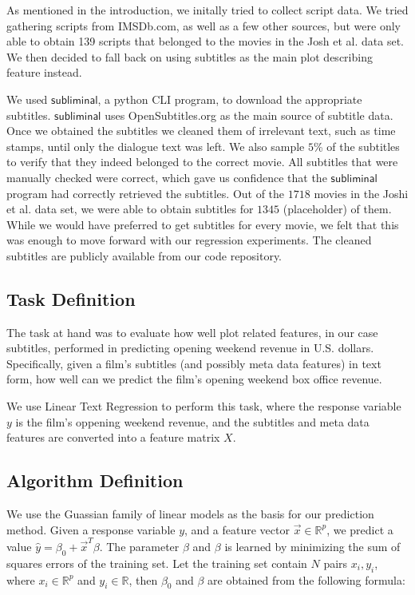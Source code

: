 \documentclass[11pt]{article}
\begin{document}
As mentioned in the introduction, we initally tried to collect script data. We tried
gathering scripts from IMSDb.com, as well as a few other sources, but were only able
to obtain 139 scripts that belonged to the movies in the Josh et al. data set. We then
decided to fall back on using subtitles as the main plot describing feature instead.

We used $\mathsf{subliminal}$, a python CLI program, to download the appropriate
subtitles. $\mathsf{subliminal}$ uses OpenSubtitles.org as the main source of subtitle
data. Once we obtained the subtitles we cleaned them of irrelevant text, such as time
stamps, until only the dialogue text was left. We also sample $5$\% of the subtitles to
verify that they indeed belonged to the correct movie. All subtitles that were manually
checked were correct, which gave us confidence that the $\mathsf{subliminal}$ program
had correctly retrieved the subtitles. Out of the $1718$ movies in the Joshi
et al. data set, we were able to obtain subtitles for $1345$ (placeholder) of them.
While we would have preferred to get subtitles for every movie, we felt that this was
enough to move forward with our regression experiments. The cleaned subtitles are
publicly available from our code repository.

\subsection{Task Definition}
The task at hand was to evaluate how well plot related features, in our case subtitles,
performed in predicting opening weekend revenue in U.S. dollars. Specifically, given
a film's subtitles (and possibly meta data features) in text form, how well can we
predict the film's opening weekend box office revenue.

We use Linear Text Regression to perform this task, where the response variable $y$ is
the film's oppening weekend revenue, and the subtitles and meta data features are
converted into a feature matrix $X$.

\subsection{Algorithm Definition}
We use the Guassian family of linear models as the basis for our prediction method.
Given a response variable $y$, and a feature vector $\vec{x} \in \mathbb{R}^p$, we
predict a value $\hat{y} = \beta_0 + \vec{x}^T \beta$. The parameter $\beta$ and $\beta$
is learned by minimizing the sum of squares errors of the training set. Let the training
set contain $N$ pairs $x_i,y_i$, where $x_i \in \mathbb{R}^p$ and $y_i \in \mathbb{R}$,
then $\beta_0$ and $\beta$ are obtained from the following formula:
\end{document}

